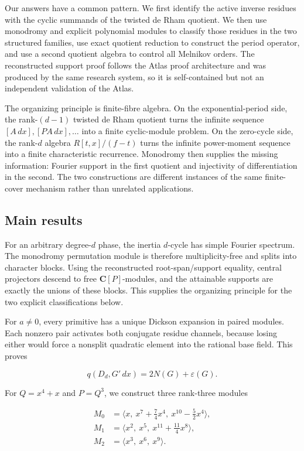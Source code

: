 \documentclass[
  11pt,
  a4paper,
]{amsart}
\begin{document}
Our answers have a common pattern. We first identify the active inverse
residues with the cyclic summands of the twisted de Rham quotient. We
then use monodromy and explicit polynomial modules to classify those
residues in the two structured families, use exact quotient reduction to
construct the period operator, and use a second quotient algebra to
control all Melnikov orders. The reconstructed support proof follows the
Atlas proof architecture and was produced by the same research system,
so it is self-contained but not an independent validation of the Atlas.

The organizing principle is finite-fibre algebra. On the
exponential-period side, the rank-\((d-1)\) twisted de Rham quotient
turns the infinite sequence \([A\,dx],[PA\,dx],\ldots\) into a finite
cyclic-module problem. On the zero-cycle side, the rank-\(d\) algebra
\(R[t,x]/(f-t)\) turns the infinite power-moment sequence into a finite
characteristic recurrence. Monodromy then supplies the missing
information: Fourier support in the first quotient and injectivity of
differentiation in the second. The two constructions are different
instances of the same finite-cover mechanism rather than unrelated
applications.

\subsection{Main results}

For an arbitrary degree-\(d\) phase, the inertia \(d\)-cycle has simple
Fourier spectrum. The monodromy permutation module is therefore
multiplicity-free and splits into character blocks. Using the
reconstructed root-span/support equality, central projectors descend to
free \(\mathbf C[P]\)-modules, and the attainable supports are exactly
the unions of these blocks. This supplies the organizing principle for
the two explicit classifications below.

For \(a\ne0\), every primitive has a unique Dickson expansion in paired
modules. Each nonzero pair activates both conjugate residue channels,
because losing either would force a nonsplit quadratic element into the
rational base field. This proves

\[
q(D_d,G'\,dx)=2N(G)+\varepsilon(G).
\]

For \(Q=x^4+x\) and \(P=Q^3\), we construct three rank-three modules

\[
\begin{aligned}
M_0&=\langle x,\ x^7+\tfrac74x^4,\ x^{10}-\tfrac52x^4\rangle,\\
M_1&=\langle x^2,\ x^5,\ x^{11}+\tfrac{11}{4}x^8\rangle,\\
M_2&=\langle x^3,\ x^6,\ x^9\rangle.
\end{aligned}
\]
\end{document}
